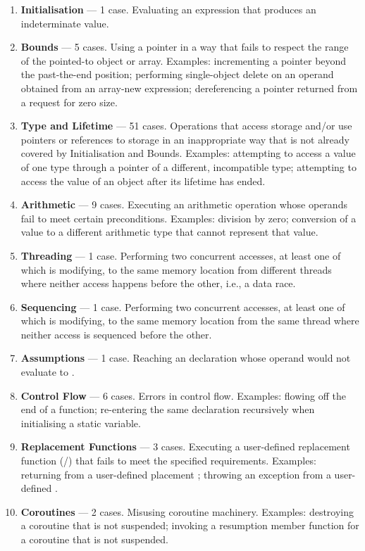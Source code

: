  \renewcommand{\labelenumi}{\Roman{enumi}.}
\begin{enumerate}
\item \textbf{Initialisation} --- 1 case. Evaluating an expression that produces an indeterminate value.
\item \textbf{Bounds} --- 5 cases. Using a pointer in a way that fails to respect the range of the pointed-to object or array. Examples: incrementing a pointer beyond the past-the-end position; performing single-object delete on an operand obtained from an array-new expression;  dereferencing a pointer returned from a request for zero size.
\item \textbf{Type and Lifetime} --- 51 cases. Operations that access storage and/or use pointers or references to storage in an inappropriate way that is not already covered by Initialisation and Bounds. Examples: attempting to access a value of one type through  a pointer of a different, incompatible type; attempting to access the value of an object after its lifetime has ended. 
\item \textbf{Arithmetic} --- 9 cases. Executing an arithmetic operation whose operands fail to meet certain preconditions. Examples: division by zero; conversion of a value to a different arithmetic type that cannot represent that value. 
\item \textbf{Threading} --- 1 case. Performing two concurrent accesses, at least one of which is modifying, to the same memory location from different threads where neither access happens before the other, i.e., a data race.
\item \textbf{Sequencing} --- 1 case. Performing two concurrent accesses, at least one of which is modifying, to the same memory location from the same thread where neither access is sequenced before the other.
\item \textbf{Assumptions} --- 1 case. Reaching an \tcode{[[assume]]} declaration whose operand would not evaluate to .
\item \textbf{Control Flow} --- 6 cases. Errors in control flow. Examples: flowing off the end of a function; re-entering the same declaration recursively when initialising a static variable.
\item \textbf{Replacement Functions} --- 3 cases. Executing a user-defined replacement function (/) that fails to meet the specified requirements. Examples: returning  from a user-defined placement ; throwing an exception from a user-defined .
\item \textbf{Coroutines} --- 2 cases. Misusing coroutine machinery. Examples: destroying a coroutine that is not suspended; invoking a resumption member function for a coroutine that is not suspended.
\end{enumerate}

